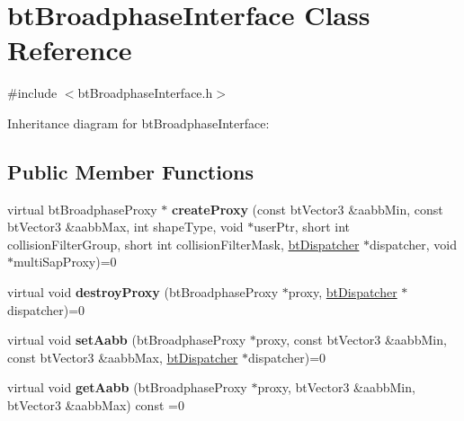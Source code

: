 \hypertarget{classbt_broadphase_interface}{\section{bt\+Broadphase\+Interface Class Reference}
\label{classbt_broadphase_interface}
}


{\ttfamily \#include $<$bt\+Broadphase\+Interface.\+h$>$}



Inheritance diagram for bt\+Broadphase\+Interface\+:
\subsection*{Public Member Functions}
\begin{DoxyCompactItemize}
\item 
\hypertarget{classbt_broadphase_interface_abf0cb7dc11f672c4b5d65ef3eee6b77d}{virtual bt\+Broadphase\+Proxy $\ast$ {\bfseries create\+Proxy} (const bt\+Vector3 \&aabb\+Min, const bt\+Vector3 \&aabb\+Max, int shape\+Type, void $\ast$user\+Ptr, short int collision\+Filter\+Group, short int collision\+Filter\+Mask, \hyperlink{classbt_dispatcher}{bt\+Dispatcher} $\ast$dispatcher, void $\ast$multi\+Sap\+Proxy)=0}\label{classbt_broadphase_interface_abf0cb7dc11f672c4b5d65ef3eee6b77d}

\item 
\hypertarget{classbt_broadphase_interface_a70f3806d52b97251af59b498947d730d}{virtual void {\bfseries destroy\+Proxy} (bt\+Broadphase\+Proxy $\ast$proxy, \hyperlink{classbt_dispatcher}{bt\+Dispatcher} $\ast$dispatcher)=0}\label{classbt_broadphase_interface_a70f3806d52b97251af59b498947d730d}

\item 
\hypertarget{classbt_broadphase_interface_a5dafdb7e104b1634202d1b21668a5aa7}{virtual void {\bfseries set\+Aabb} (bt\+Broadphase\+Proxy $\ast$proxy, const bt\+Vector3 \&aabb\+Min, const bt\+Vector3 \&aabb\+Max, \hyperlink{classbt_dispatcher}{bt\+Dispatcher} $\ast$dispatcher)=0}\label{classbt_broadphase_interface_a5dafdb7e104b1634202d1b21668a5aa7}

\item 
\hypertarget{classbt_broadphase_interface_a8fc16d360eea987b878ab7fd2efcabe3}{virtual void {\bfseries get\+Aabb} (bt\+Broadphase\+Proxy $\ast$proxy, bt\+Vector3 \&aabb\+Min, bt\+Vector3 \&aabb\+Max) const =0}\label{classbt_broadphase_interface_a8fc16d360eea987b878ab7fd2efcabe3}


\end{DoxyCompactItemize}
